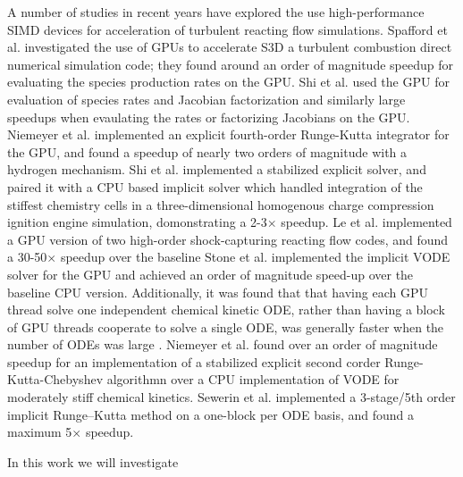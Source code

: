 \documentclass[preprint,12pt]{elsarticle}
\begin{document}
A number of studies in recent years have explored the use high-performance SIMD devices for acceleration of turbulent reacting flow simulations.
Spafford et al. \cite{Spafford:2010aa} investigated the use of GPUs to accelerate S3D \cite{CHEN:2009s3d} a turbulent combustion direct numerical simulation code; they found around an order of magnitude speedup for evaluating the species production rates on the GPU.
Shi et al. \cite{Shi:2011aa} used the GPU for evaluation of species rates and Jacobian factorization and similarly large speedups when evaulating the rates or factorizing Jacobians on the GPU.
Niemeyer et al. \cite{Niemeyer:2011aa} implemented an explicit fourth-order Runge-Kutta integrator for the GPU, and found a speedup of nearly two orders of magnitude with a hydrogen mechanism.
Shi et al. \cite{Shi:2012aa} implemented a stabilized explicit solver, and paired it with a CPU based implicit solver which handled integration of the stiffest chemistry cells in a three-dimensional homogenous charge compression ignition engine simulation, domonstrating a 2-3$\times$ speedup.
Le et al. \cite{Le2013596} implemented a GPU version of two high-order shock-capturing reacting flow codes, and found a 30-50$\times$ speedup over the baseline 
Stone et al. \cite{Stone:2013aa} implemented the implicit VODE \cite{brown1989vode} solver for the GPU and achieved an order of magnitude speed-up over the baseline CPU version.
Additionally, it was found that that having each GPU thread solve one independent chemical kinetic ODE, rather than having a block of GPU threads cooperate to solve a single ODE, was generally faster when the number of ODEs was large \cite{Stone:2013aa}.
Niemeyer et al. \cite{Niemeyer:2014aa} found over an order of magnitude speedup for an implementation of a stabilized explicit second corder Runge-Kutta-Chebyshev algorithmn over a CPU implementation of VODE for moderately stiff chemical kinetics.
Sewerin et al. \cite{Sewerin20151375} implemented a 3-stage/5th order implicit Runge--Kutta method on a one-block per ODE basis, and found a maximum 5$\times$ speedup.

In this work we will investigate

\pagebreak



\end{document}
